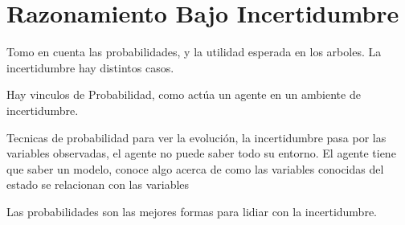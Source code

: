 \section{Razonamiento Bajo Incertidumbre}

Tomo en cuenta las probabilidades, y la utilidad esperada en los arboles.
La incertidumbre hay distintos casos. 

Hay vinculos de Probabilidad, como actúa un agente en un ambiente de incertidumbre. 

Tecnicas de probabilidad para ver la evolución, la incertidumbre pasa por las variables observadas, el agente no puede saber todo su entorno.
El agente tiene que saber un modelo, conoce algo acerca de como las variables conocidas del estado se relacionan con las variables

Las probabilidades son las mejores formas para lidiar con la incertidumbre. 